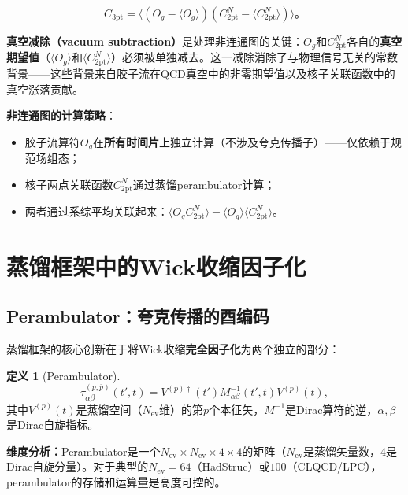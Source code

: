 \documentclass[12pt,a4paper]{ctexart}
\theoremstyle{definition}
\newtheorem{definition}{定义}[section]
\begin{document}
\begin{equation}
\boxed{C_{\text{3pt}} = \langle (O_g - \langle O_g \rangle)(C^N_{\text{2pt}} - \langle C^N_{\text{2pt}} \rangle) \rangle}。
\label{eq:disconnected_3pt}
\end{equation}

\textbf{真空减除（vacuum subtraction）}是处理非连通图的关键：$O_g$和$C^N_{\text{2pt}}$各自的\textbf{真空期望值}（$\langle O_g \rangle$和$\langle C^N_{\text{2pt}} \rangle$）必须被单独减去。这一减除消除了与物理信号无关的常数背景——这些背景来自胶子流在QCD真空中的非零期望值以及核子关联函数中的真空涨落贡献。

\textbf{非连通图的计算策略}\cite{NoteGluonPDFs}：
\begin{itemize}
    \item 胶子流算符$O_g$在\textbf{所有时间片}上独立计算（不涉及夸克传播子）——仅依赖于规范场组态；
    \item 核子两点关联函数$C^N_{\text{2pt}}$通过蒸馏perambulator计算；
    \item 两者通过系综平均关联起来：$\langle O_g C^N_{\text{2pt}} \rangle - \langle O_g \rangle \langle C^N_{\text{2pt}} \rangle$。
\end{itemize}

\section{蒸馏框架中的Wick收缩因子化}

\subsection{Perambulator：夸克传播的酉编码}

蒸馏框架的核心创新在于将Wick收缩\textbf{完全因子化}为两个独立的部分\cite{Peardon2009,Egerer2021a,NoteGluonPDFs}：

\begin{definition}[Perambulator]
\begin{equation}
\boxed{\tau^{(p,\bar{p})}_{\alpha\beta}(t', t) = V^{(p)\dagger}(t') M^{-1}_{\alpha\beta}(t', t) V^{(\bar{p})}(t)},
\label{eq:perambulator}
\end{equation}
其中$V^{(p)}(t)$是蒸馏空间（$N_{\text{ev}}$维）的第$p$个本征矢，$M^{-1}$是Dirac算符的逆，$\alpha,\beta$是Dirac自旋指标。
\end{definition}

\textbf{维度分析：}Perambulator是一个$N_{\text{ev}} \times N_{\text{ev}} \times 4 \times 4$的矩阵（$N_{\text{ev}}$是蒸馏矢量数，4是Dirac自旋分量）。对于典型的$N_{\text{ev}} = 64$（HadStruc）或$100$（CLQCD/LPC），perambulator的存储和运算量是高度可控的\cite{Chen2025gluon,Egerer2022}。
\end{document}
